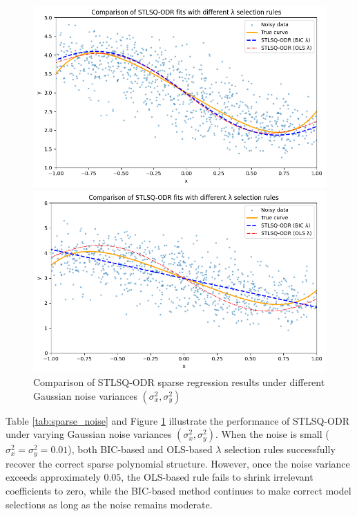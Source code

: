 \begin{figure}
\begin{minipage}{0.45\textwidth}
    \centering
    \includegraphics[width=\linewidth]{MSc_Statistics_Research_Report_Template/images/0.3,0.3.png}
\end{minipage}
\begin{minipage}{0.45\textwidth}
    \centering
    \includegraphics[width=\linewidth]{MSc_Statistics_Research_Report_Template/images/0.4,0.4.png}
\end{minipage}
\caption{Comparison of STLSQ-ODR sparse regression results under different Gaussian noise variances $(\sigma_x^2, \sigma_y^2)$}
\label{fig:stlsq_odr_g}
\end{figure}


Table \ref{tab:sparse_noise} and Figure \ref{fig:stlsq_odr_g} illustrate the performance of STLSQ-ODR under varying Gaussian noise variances $(\sigma_x^2,\sigma_y^2)$. When the noise is small ($\sigma_x^2=\sigma_y^2=0.01$), both BIC-based and OLS-based $\lambda$ selection rules successfully recover the correct sparse polynomial structure. However, once the noise variance exceeds approximately $0.05$, the OLS-based rule fails to shrink irrelevant coefficients to zero, while the BIC-based method continues to make correct model selections as long as the noise remains moderate.



